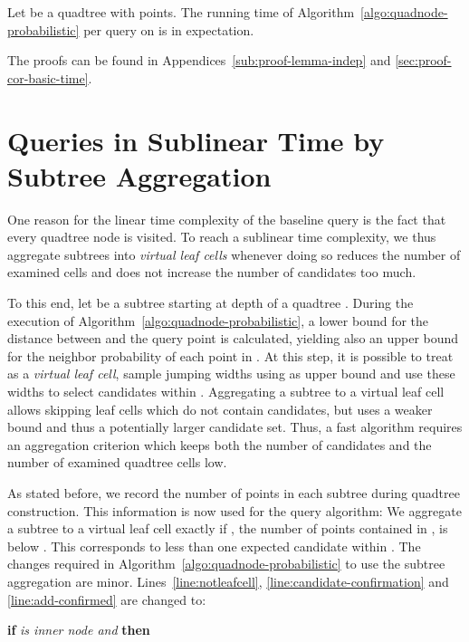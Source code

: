 \documentclass{llncs}
\begin{document}
\begin{proposition}
\label{cor:basic-time}
Let  be a quadtree with  points.
The running time of Algorithm~\ref{algo:quadnode-probabilistic} per query on  is  in expectation.
\end{proposition}
The proofs can be found in Appendices~\ref{sub:proof-lemma-indep} and \ref{sec:proof-cor-basic-time}.

\section{Queries in Sublinear Time by Subtree Aggregation}
\label{sec:subtree-aggr}
One reason for the linear time complexity of the baseline query is the fact that every quadtree node is visited.
To reach a sublinear time complexity, we thus aggregate subtrees into \emph{virtual leaf cells} whenever doing so reduces the number of examined cells and does not increase the number of candidates too much.

To this end, let  be a subtree starting at depth  of a quadtree .
During the execution of Algorithm~\ref{algo:quadnode-probabilistic}, a lower bound  for the distance between  and the query point  is calculated,
yielding also an upper bound  for the neighbor probability of each point in .
At this step, it is possible to treat  as a \emph{virtual leaf cell}, sample jumping widths using  as upper bound and use these widths to select candidates within .
Aggregating a subtree to a virtual leaf cell allows skipping leaf cells which do not contain candidates, but uses a weaker bound  and thus a potentially larger candidate set.
Thus, a fast algorithm requires an aggregation criterion which keeps both the number of candidates and the number of examined quadtree cells low.

As stated before, we record the number of points in each subtree during quadtree construction.
This information is now used for the query algorithm:
We aggregate a subtree  to a virtual leaf cell exactly if , the number of points contained in , is below .
This corresponds to less than one expected candidate within .
The changes required in Algorithm~\ref{algo:quadnode-probabilistic} to use the subtree aggregation are minor.
Lines~\ref{line:notleafcell}, \ref{line:candidate-confirmation} and \ref{line:add-confirmed} are changed to:

\LinesNotNumbered
\begin{algorithm}[H]
 \textbf{if}\emph{ is inner node and }\textbf{ then}
\end{algorithm}
\end{document}
